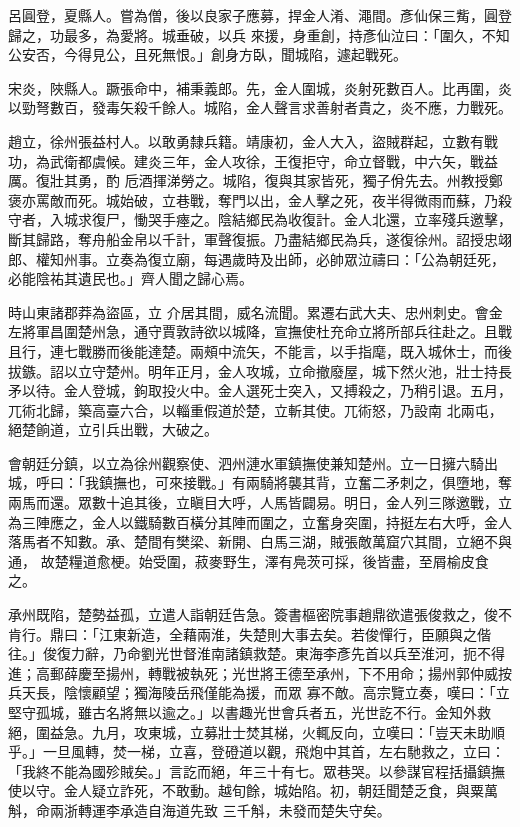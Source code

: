 \begin{pinyinscope}
 呂圓登，夏縣人。嘗為僧，後以良家子應募，捍金人淆、澠間。彥仙保三觜，圓登歸之，功最多，為愛將。城垂破，以兵
 來援，身重創，持彥仙泣曰：「圍久，不知公安否，今得見公，且死無恨。」創身方臥，聞城陷，遽起戰死。



 宋炎，陜縣人。蹶張命中，補秉義郎。先，金人圍城，炎射死數百人。比再圍，炎以勁弩數百，發毒矢殺千餘人。城陷，金人聲言求善射者貴之，炎不應，力戰死。



 趙立，徐州張益村人。以敢勇隸兵籍。靖康初，金人大入，盜賊群起，立數有戰功，為武衛都虞候。建炎三年，金人攻徐，王復拒守，命立督戰，中六矢，戰益厲。復壯其勇，酌
 卮酒揮涕勞之。城陷，復與其家皆死，獨子佾先去。州教授鄭褒亦罵敵而死。城始破，立巷戰，奪門以出，金人擊之死，夜半得微雨而蘇，乃殺守者，入城求復尸，慟哭手瘞之。陰結鄉民為收復計。金人北還，立率殘兵邀擊，斷其歸路，奪舟船金帛以千計，軍聲復振。乃盡結鄉民為兵，遂復徐州。詔授忠翊郎、權知州事。立奏為復立廟，每遇歲時及出師，必帥眾泣禱曰：「公為朝廷死，必能陰祐其遺民也。」齊人聞之歸心焉。



 時山東諸郡莽為盜區，立
 介居其間，威名流聞。累遷右武大夫、忠州刺史。會金左將軍昌圍楚州急，通守賈敦詩欲以城降，宣撫使杜充命立將所部兵往赴之。且戰且行，連七戰勝而後能達楚。兩頰中流矢，不能言，以手指麾，既入城休士，而後拔鏃。詔以立守楚州。明年正月，金人攻城，立命撤廢屋，城下然火池，壯士持長矛以待。金人登城，鉤取投火中。金人選死士突入，又搏殺之，乃稍引退。五月，兀術北歸，築高臺六合，以輜重假道於楚，立斬其使。兀術怒，乃設南
 北兩屯，絕楚餉道，立引兵出戰，大破之。



 會朝廷分鎮，以立為徐州觀察使、泗州漣水軍鎮撫使兼知楚州。立一日擁六騎出城，呼曰：「我鎮撫也，可來接戰。」有兩騎將襲其背，立奮二矛刺之，俱墮地，奪兩馬而還。眾數十追其後，立瞋目大呼，人馬皆闢易。明日，金人列三隊邀戰，立為三陣應之，金人以鐵騎數百橫分其陣而圍之，立奮身突圍，持挺左右大呼，金人落馬者不知數。承、楚間有樊梁、新開、白馬三湖，賊張敵萬窟穴其間，立絕不與通，
 故楚糧道愈梗。始受圍，菽麥野生，澤有鳧茨可採，後皆盡，至屑榆皮食之。



 承州既陷，楚勢益孤，立遣人詣朝廷告急。簽書樞密院事趙鼎欲遣張俊救之，俊不肯行。鼎曰：「江東新造，全藉兩淮，失楚則大事去矣。若俊憚行，臣願與之偕往。」俊復力辭，乃命劉光世督淮南諸鎮救楚。東海李彥先首以兵至淮河，扼不得進；高郵薛慶至揚州，轉戰被執死；光世將王德至承州，下不用命；揚州郭仲威按兵天長，陰懷顧望；獨海陵岳飛僅能為援，而眾
 寡不敵。高宗覽立奏，嘆曰：「立堅守孤城，雖古名將無以逾之。」以書趣光世會兵者五，光世訖不行。金知外救絕，圍益急。九月，攻東城，立募壯士焚其梯，火輒反向，立嘆曰：「豈天未助順乎。」一旦風轉，焚一梯，立喜，登磴道以觀，飛炮中其首，左右馳救之，立曰：「我終不能為國殄賊矣。」言訖而絕，年三十有七。眾巷哭。以參謀官程括攝鎮撫使以守。金人疑立詐死，不敢動。越旬餘，城始陷。初，朝廷聞楚乏食，與粟萬斛，命兩浙轉運李承造自海道先致
 三千斛，未發而楚失守矣。




\end{pinyinscope}
